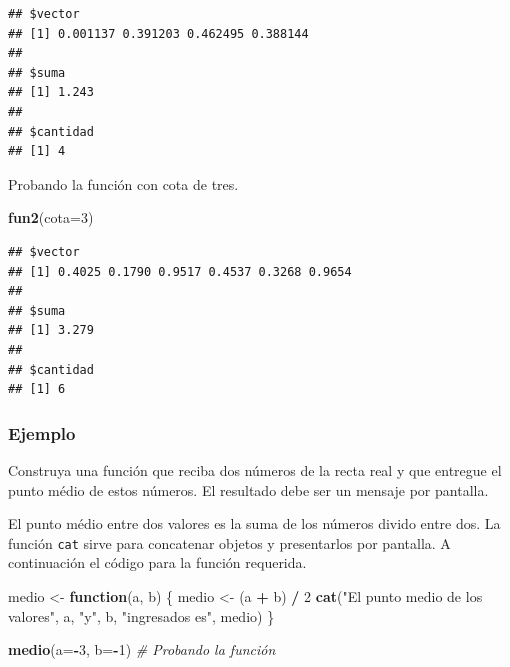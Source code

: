 \documentclass[10pt,]{krantz}
\makeatletter
\newenvironment{Shaded}{\begin{snugshade}}{\end{snugshade}}
\newcommand{\KeywordTok}[1]{\textcolor[rgb]{0.13,0.29,0.53}{\textbf{#1}}}
\newcommand{\DataTypeTok}[1]{\textcolor[rgb]{0.13,0.29,0.53}{#1}}
\newcommand{\DecValTok}[1]{\textcolor[rgb]{0.00,0.00,0.81}{#1}}
\newcommand{\StringTok}[1]{\textcolor[rgb]{0.31,0.60,0.02}{#1}}
\newcommand{\CommentTok}[1]{\textcolor[rgb]{0.56,0.35,0.01}{\textit{#1}}}
\newcommand{\ControlFlowTok}[1]{\textcolor[rgb]{0.13,0.29,0.53}{\textbf{#1}}}
\newcommand{\OperatorTok}[1]{\textcolor[rgb]{0.81,0.36,0.00}{\textbf{#1}}}
\newcommand{\NormalTok}[1]{#1}
\newenvironment{kframe}{%
\medskip{}
\setlength{\fboxsep}{.8em}
 \def\at@end@of@kframe{}%
 \ifinner\ifhmode%
  \def\at@end@of@kframe{\end{minipage}}%
  \begin{minipage}{\columnwidth}%
 \fi\fi%
 \def\FrameCommand##1{\hskip\@totalleftmargin \hskip-\fboxsep
 \colorbox{shadecolor}{##1}\hskip-\fboxsep
     \hskip-\linewidth \hskip-\@totalleftmargin \hskip\columnwidth}%
 \MakeFramed {\advance\hsize-\width
   \@totalleftmargin\z@ \linewidth\hsize
   \@setminipage}}%
 {\par\unskip\endMakeFramed%
 \at@end@of@kframe}
\renewenvironment{Shaded}{\begin{kframe}}{\end{kframe}}
\makeatother
\begin{document}
\begin{verbatim}
## $vector
## [1] 0.001137 0.391203 0.462495 0.388144
## 
## $suma
## [1] 1.243
## 
## $cantidad
## [1] 4
\end{verbatim}

Probando la función con cota de tres.

\begin{Shaded}
\begin{Highlighting}[]
\KeywordTok{fun2}\NormalTok{(}\DataTypeTok{cota=}\DecValTok{3}\NormalTok{)}
\end{Highlighting}
\end{Shaded}

\begin{verbatim}
## $vector
## [1] 0.4025 0.1790 0.9517 0.4537 0.3268 0.9654
## 
## $suma
## [1] 3.279
## 
## $cantidad
## [1] 6
\end{verbatim}

\subsubsection*{Ejemplo}\label{ejemplo-8}

Construya una función que reciba dos números de la recta real y que
entregue el punto médio de estos números. El resultado debe ser un
mensaje por pantalla.

El punto médio entre dos valores es la suma de los números divido entre
dos. La función \texttt{cat} sirve para concatenar objetos y
presentarlos por pantalla. A continuación el código para la función
requerida.

\begin{Shaded}
\begin{Highlighting}[]
\NormalTok{medio <-}\StringTok{ }\ControlFlowTok{function}\NormalTok{(a, b) \{}
\NormalTok{  medio <-}\StringTok{ }\NormalTok{(a }\OperatorTok{+}\StringTok{ }\NormalTok{b) }\OperatorTok{/}\StringTok{ }\DecValTok{2}
  \KeywordTok{cat}\NormalTok{(}\StringTok{"El punto medio de los valores"}\NormalTok{,}
\NormalTok{      a, }\StringTok{"y"}\NormalTok{, b,}
      \StringTok{"ingresados es"}\NormalTok{, medio)}
\NormalTok{\}}

\KeywordTok{medio}\NormalTok{(}\DataTypeTok{a=}\OperatorTok{-}\DecValTok{3}\NormalTok{, }\DataTypeTok{b=}\OperatorTok{-}\DecValTok{1}\NormalTok{)  }\CommentTok{# Probando la función}
\end{Highlighting}
\end{Shaded}
\end{document}
